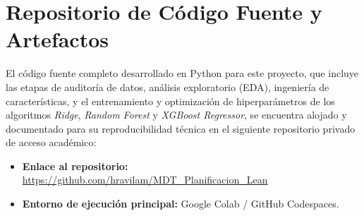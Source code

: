 \documentclass[conference,twoside]{IEEEtran}
\begin{document}
\section{Repositorio de Código Fuente y Artefactos}\label{anex:A}

El código fuente completo desarrollado en Python para este proyecto, que incluye las etapas de auditoría de datos, análisis exploratorio (EDA), ingeniería de características, y el entrenamiento y optimización de hiperparámetros de los algoritmos \textit{Ridge}, \textit{Random Forest} y \textit{XGBoost Regressor}, se encuentra alojado y documentado para su reproducibilidad técnica en el siguiente repositorio privado de acceso académico:
\begin{itemize}
    \item \textbf{Enlace al repositorio:} \url{https://github.com/hravilam/MDT_Planificacion_Lean}
    \item \textbf{Entorno de ejecución principal:} Google Colab / GitHub Codespaces.
\end{itemize}

\balance


\end{document}
